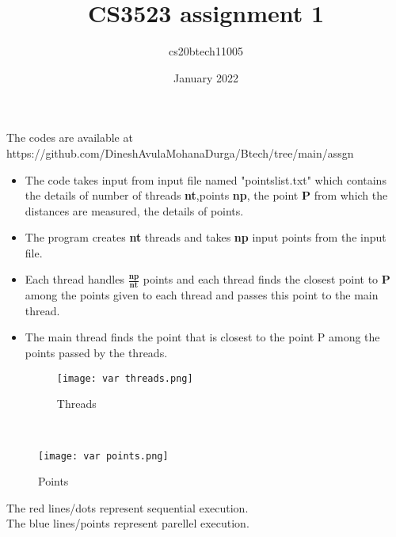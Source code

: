 \documentclass[15pt]{article}
\title{CS3523 assignment 1}
\author{cs20btech11005 }
\date{January 2022}
\begin{document}
\maketitle

The codes are available at https://github.com/DineshAvulaMohanaDurga/Btech/tree/main/assgn%

\begin{itemize}
\item The code takes input from input file named "pointslist.txt" which contains the details of number of threads \textbf{nt},points \textbf{np}, the point \textbf{P} from which the distances are measured, the details of points.
\item The program creates \textbf{nt} threads and takes \textbf{np} input points from the input file.
\item Each thread handles $\frac{\textbf{np}}{\textbf{nt}}$ points and each thread finds the closest point to \textbf{P} among the points given to each thread and passes this point to the main thread.
\item The main thread finds the point that is closest to the point P among the points passed by the threads.
\begin{figure}[ht]
    \centering
    \texttt{[image: var threads.png]}
    \caption{Threads}
    \label{fig:var threads}
\end{figure} \\
\end{itemize}
\begin{figure}[ht]
    \centering
    \texttt{[image: var points.png]}
    \caption{Points}
    \label{fig:var points}
\end{figure} 
The red lines/dots represent sequential execution.\\
The blue lines/points represent parellel execution.
\end{document}
